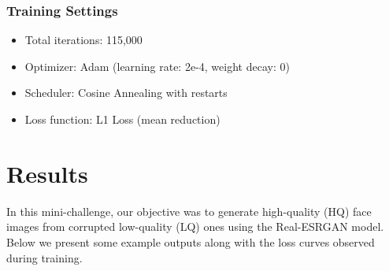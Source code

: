 \documentclass{article}
\begin{document}
\subsubsection{Training Settings}
\begin{itemize}
    \item Total iterations: 115,000
    \item Optimizer: Adam (learning rate: 2e-4, weight decay: 0)
    \item Scheduler: Cosine Annealing with restarts
    \item Loss function: L1 Loss (mean reduction)
\end{itemize}



\section{Results}
\label{sec:results} %

In this mini-challenge, our objective was to generate high-quality (HQ) face images from corrupted low-quality (LQ) ones using the Real-ESRGAN model. Below we present some example outputs along with the loss curves observed during training.
\end{document}

